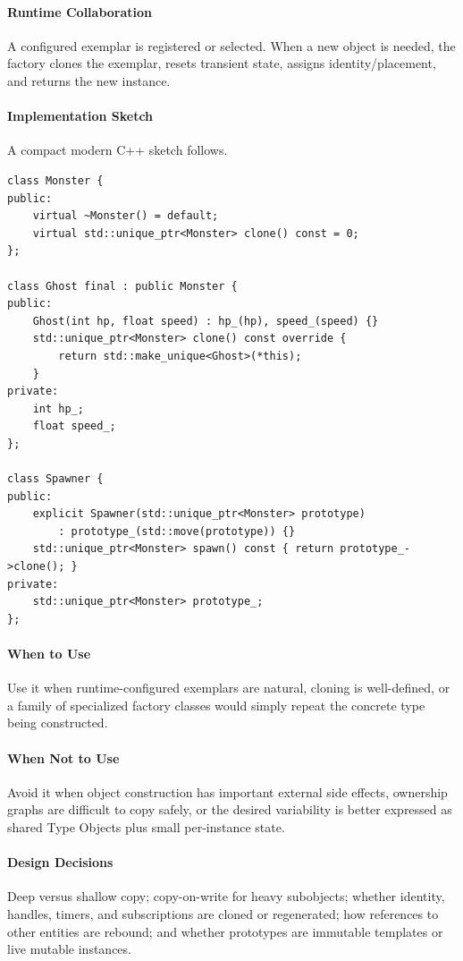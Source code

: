\documentclass[11pt]{article}
\begin{document}
\paragraph{Runtime Collaboration} A configured exemplar is registered or selected. When a new object is needed, the factory clones the exemplar, resets transient state, assigns identity/placement, and returns the new instance.
\paragraph{Implementation Sketch} A compact modern C++ sketch follows.
\begin{lstlisting}
class Monster {
public:
    virtual ~Monster() = default;
    virtual std::unique_ptr<Monster> clone() const = 0;
};

class Ghost final : public Monster {
public:
    Ghost(int hp, float speed) : hp_(hp), speed_(speed) {}
    std::unique_ptr<Monster> clone() const override {
        return std::make_unique<Ghost>(*this);
    }
private:
    int hp_;
    float speed_;
};

class Spawner {
public:
    explicit Spawner(std::unique_ptr<Monster> prototype)
        : prototype_(std::move(prototype)) {}
    std::unique_ptr<Monster> spawn() const { return prototype_->clone(); }
private:
    std::unique_ptr<Monster> prototype_;
};
\end{lstlisting}
\paragraph{When to Use} Use it when runtime-configured exemplars are natural, cloning is well-defined, or a family of specialized factory classes would simply repeat the concrete type being constructed.
\paragraph{When Not to Use} Avoid it when object construction has important external side effects, ownership graphs are difficult to copy safely, or the desired variability is better expressed as shared Type Objects plus small per-instance state.
\paragraph{Design Decisions} Deep versus shallow copy; copy-on-write for heavy subobjects; whether identity, handles, timers, and subscriptions are cloned or regenerated; how references to other entities are rebound; and whether prototypes are immutable templates or live mutable instances.
\end{document}

